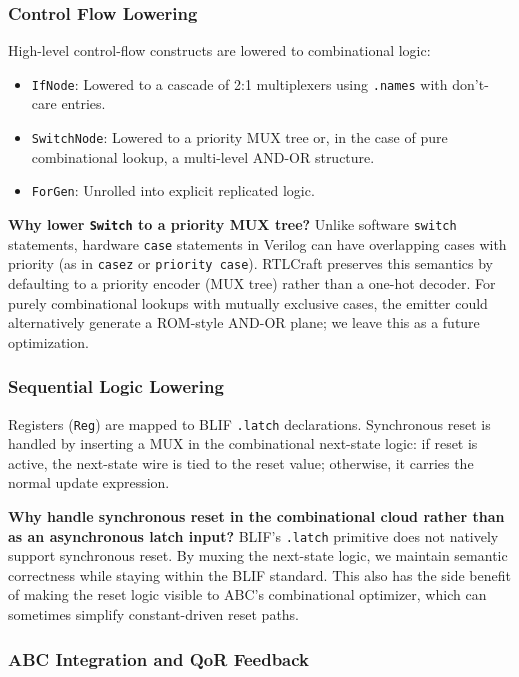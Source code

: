 \documentclass[11pt]{article}
\begin{document}
\subsubsection{Control Flow Lowering}

High-level control-flow constructs are lowered to combinational logic:
\begin{itemize}
    \item \texttt{IfNode}: Lowered to a cascade of 2:1 multiplexers using \texttt{.names} with don't-care entries.
    \item \texttt{SwitchNode}: Lowered to a priority MUX tree or, in the case of pure combinational lookup, a multi-level AND-OR structure.
    \item \texttt{ForGen}: Unrolled into explicit replicated logic.
\end{itemize}

\textbf{Why lower \texttt{Switch} to a priority MUX tree?} Unlike software \texttt{switch} statements, hardware \texttt{case} statements in Verilog can have overlapping cases with priority (as in \texttt{casez} or \texttt{priority case}). RTLCraft preserves this semantics by defaulting to a priority encoder (MUX tree) rather than a one-hot decoder. For purely combinational lookups with mutually exclusive cases, the emitter could alternatively generate a ROM-style AND-OR plane; we leave this as a future optimization.

\subsubsection{Sequential Logic Lowering}

Registers (\texttt{Reg}) are mapped to BLIF \texttt{.latch} declarations. Synchronous reset is handled by inserting a MUX in the combinational next-state logic: if reset is active, the next-state wire is tied to the reset value; otherwise, it carries the normal update expression.

\textbf{Why handle synchronous reset in the combinational cloud rather than as an asynchronous latch input?} BLIF's \texttt{.latch} primitive does not natively support synchronous reset. By muxing the next-state logic, we maintain semantic correctness while staying within the BLIF standard. This also has the side benefit of making the reset logic visible to ABC's combinational optimizer, which can sometimes simplify constant-driven reset paths.

\subsubsection{ABC Integration and QoR Feedback}
\end{document}
